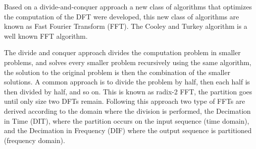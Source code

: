 




Based on a divide-and-conquer approach a new class of algorithms that optimizes the computation of the DFT were developed, this new class of algorithms are known as Fast Fourier Transform (FFT). The Cooley and Turkey\cite{cooley_1965} algorithm is a well known FFT algorithm.

The divide and conquer approach divides the computation problem in smaller problems, and solves every smaller problem recursively using the same algorithm, the solution to the original problem is then the combination of the smaller solutions. A common approach is to divide the problem by half, then each half is then divided by half, and so on. This is known as radix-2 FFT, the partition goes until only size two DFTs remain. Following this approach two type of FFTs are derived according to the domain where the division is performed, the Decimation in Time (DIT), where the partition occurs on the input sequence (time domain), and the Decimation in Frequency (DIF) where the output sequence is partitioned (frequency domain). 


